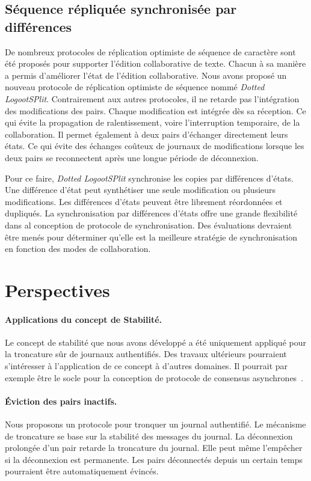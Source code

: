 \subsection{Séquence répliquée synchronisée par différences}

De nombreux protocoles de réplication optimiste de séquence de caractère sont été proposés pour supporter l'édition collaborative de texte.
Chacun à sa manière a permis d'améliorer l'état de l'édition collaborative.
Nous avons proposé un nouveau protocole de réplication optimiste de séquence nommé \emph{Dotted LogootSPlit}.
Contrairement aux autres protocoles, il ne retarde pas l'intégration des modifications des pairs.
Chaque modification est intégrée dès sa réception.
Ce qui évite la propagation de ralentissement, voire l'interruption temporaire, de la collaboration.
Il permet également à deux pairs d'échanger directement leurs états.
Ce qui évite des échanges coûteux de journaux de modifications lorsque les deux pairs se reconnectent après une longue période de déconnexion.

Pour ce faire, \emph{Dotted LogootSPlit} synchronise les copies par différences d'états.
Une différence d'état peut synthétiser une seule modification ou plusieurs modifications.
Les différences d'états peuvent être librement réordonnées et dupliqués.
La synchronisation par différences d'états offre une grande flexibilité dans al conception de protocole de synchronisation.
Des évaluations devraient être menés pour déterminer qu'elle est la meilleure stratégie de synchronisation en fonction des modes de collaboration.


\section{Perspectives}

\paragraph{Applications du concept de Stabilité.} Le concept de stabilité que nous avons développé a été uniquement appliqué pour la troncature sûr de journaux authentifiés.
Des travaux ultérieurs pourraient s'intéresser à l'application de ce concept à d'autres domaines.
Il pourrait par exemple être le socle pour la conception de protocole de consensus asynchrones~\autocite{bracha1985asynchronous}.

\paragraph{Éviction des pairs inactifs.}
Nous proposons un protocole pour tronquer un journal authentifié.
Le mécanisme de troncature se base sur la stabilité des messages du journal.
La déconnexion prolongée d'un pair retarde la troncature du journal.
Elle peut même l'empêcher si la déconnexion est permanente.
Les pairs déconnectés depuis un certain temps pourraient être automatiquement évincés.


